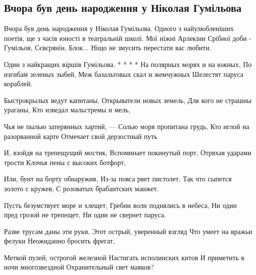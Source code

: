  
 
 
 
 
\subsection{Вчора був день народження у Ніколая Гумільова}
\label{sec:16_04_2021.fb.makarenko_oksana.1.gumilev_nikolaj}

Вчора був день народження у Ніколая Гумільова. Одного з найулюбленіших поетів,
ще з часів юності в театральній школі. Мої ніжні Арлекіни Срібної доби -
Гумільов, Сєвєрянін, Блок... Ніщо не змусить перестати вас любити.

Один з найкращих віршів Гумільова.
*   *   *   *
На полярных морях и на южных,
По изгибам зеленых зыбей,
Меж базальтовых скал и жемчужных
Шелестят паруса кораблей.

Быстрокрылых ведут капитаны,
Открыватели новых земель,
Для кого не страшны ураганы,
Кто изведал мальстремы и мель,

Чья не пылью затерянных хартий, —
Солью моря пропитана грудь,
Кто иглой на разорванной карте
Отмечает свой дерзостный путь

И, взойдя на трепещущий мостик,
Вспоминает покинутый порт,
Отряхая ударами трости
Клочья пены с высоких ботфорт,

Или, бунт на борту обнаружив,
Из-за пояса рвет пистолет,
Так что сыпется золото с кружев,
С розоватых брабантских манжет.

Пусть безумствует море и хлещет,
Гребни волн поднялись в небеса,
Ни один пред грозой не трепещет,
Ни один не свернет паруса.

Разве трусам даны эти руки,
Этот острый, уверенный взгляд
Что умеет на вражьи фелуки
Неожиданно бросить фрегат,

Меткой пулей, острогой железной
Настигать исполинских китов
И приметить в ночи многозвездной
Охранительный свет маяков?

